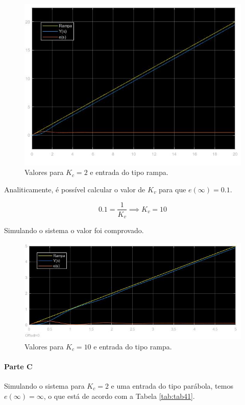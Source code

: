 \documentclass[
]{book}
\begin{document}
\begin{figure}
\includegraphics[width=0.8\linewidth]{Imagens/Lab4/Resolução/prob2B1} \caption{Valores para $K_c = 2$ e entrada do tipo rampa.}\label{fig:fig42B1}
\end{figure}

Analiticamente, é possível calcular o valor de \(K_v\) para que \(e(\infty) = 0.1\).

\[
0.1 = \frac {1}{K_v} \implies K_v = 10
\]

Simulando o sistema o valor foi comprovado.

\begin{figure}
\includegraphics[width=0.8\linewidth]{Imagens/Lab4/Resolução/prob2B2} \caption{Valores para $K_c = 10$ e entrada do tipo rampa.}\label{fig:fig42B2}
\end{figure}

\hypertarget{parte-c-1}{%
\paragraph*{Parte C}\label{parte-c-1}}

Simulando o sistema para \(K_c = 2\) e uma entrada do tipo parábola, temos \(e(\infty) = \infty\), o que está de acordo com a Tabela \ref{tab:tab41}.
\end{document}
